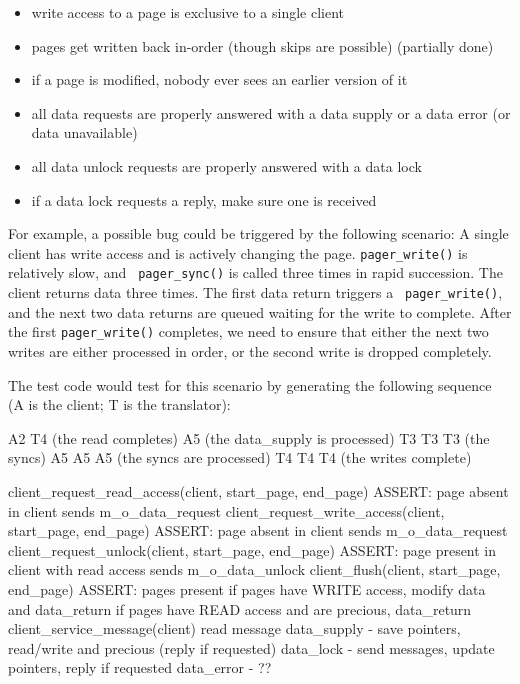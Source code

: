 \documentclass{article}
\begin{document}
\begin{itemize}
\item write access to a page is exclusive to a single client
\item pages get written back in-order (though skips are possible) (partially done)
\item if a page is modified, nobody ever sees an earlier version of it
\item all data requests are properly answered with a data supply or a data error (or data unavailable)
\item all data unlock requests are properly answered with a data lock
\item if a data lock requests a reply, make sure one is received
\end{itemize}

For example, a possible bug could be triggered by the following
scenario: A single client has write access and is actively changing
the page.  {\tt pager_write()} is relatively slow, and {\tt
  pager_sync()} is called three times in rapid succession.  The client
returns data three times.  The first data return triggers a {\tt
  pager_write()}, and the next two data returns are queued waiting for
the write to complete.  After the first {\tt pager_write()} completes,
we need to ensure that either the next two writes are either processed
in order, or the second write is dropped completely.

The test code would test for this scenario by generating the following
sequence (A is the client; T is the translator):

A2 T4 (the read completes) A5 (the data_supply is processed)
    T3 T3 T3 (the syncs) A5 A5 A5 (the syncs are processed) T4 T4 T4 (the writes complete)

client_request_read_access(client, start_page, end_page)
  ASSERT: page absent in client
  sends m_o_data_request
client_request_write_access(client, start_page, end_page)
  ASSERT: page absent in client
  sends m_o_data_request
client_request_unlock(client, start_page, end_page)
  ASSERT: page present in client with read access
  sends m_o_data_unlock
client_flush(client, start_page, end_page)
  ASSERT: pages present
  if pages have WRITE access, modify data and data_return
  if pages have READ access and are precious, data_return
client_service_message(client)
  read message
  data_supply - save pointers, read/write and precious (reply if requested)
  data_lock - send messages, update pointers, reply if requested
  data_error - ??
\end{document}
